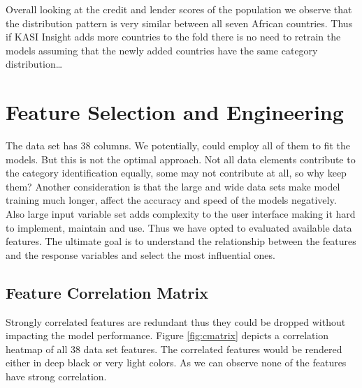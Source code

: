Overall looking at the credit and lender scores of the population we
observe that the distribution pattern is very similar between all seven
African countries. Thus if KASI Insight adds more countries to the fold
there is no need to retrain the models assuming that the newly added
countries have the same category distribution\ldots{}

\hypertarget{feature-selection-and-engineering}{%
\section{Feature Selection and
Engineering}\label{feature-selection-and-engineering}}

The data set has 38 columns. We potentially, could employ all of them to
fit the models. But this is not the optimal approach. Not all data
elements contribute to the category identification equally, some may not
contribute at all, so why keep them? Another consideration is that the
large and wide data sets make model training much longer, affect the
accuracy and speed of the models negatively. Also large input variable
set adds complexity to the user interface making it hard to implement,
maintain and use. Thus we have opted to evaluated available data
features. The ultimate goal is to understand the relationship between
the features and the response variables and select the most influential
ones.

\hypertarget{feature-correlation-matrix}{%
\subsection{Feature Correlation
Matrix}\label{feature-correlation-matrix}}

Strongly correlated features are redundant thus they could be dropped
without impacting the model performance. Figure \ref{fig:cmatrix}
depicts a correlation heatmap of all 38 data set features. The
correlated features would be rendered either in deep black or very light
colors. As we can observe none of the features have strong correlation.

